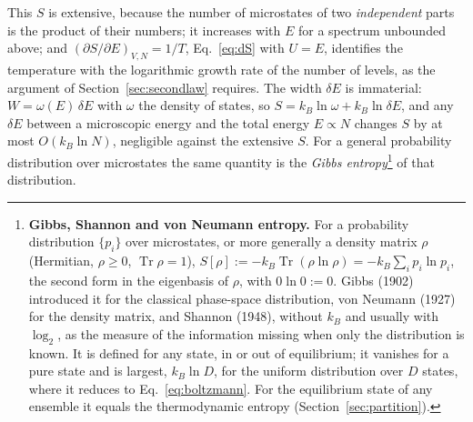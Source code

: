 \documentclass[10pt,a4paper]{article}
\theoremstyle{remark}
\newcommand{\Tr}{\operatorname{Tr}}
\begin{document}
This $S$ is extensive, because the number of microstates of two
\emph{independent} parts is the product of their numbers; it increases with
$E$ for a spectrum unbounded above; and $(\partial S/\partial E)_{V,N}=1/T$,
Eq.~\eqref{eq:dS} with $U=E$, identifies the temperature with the logarithmic
growth rate of the number of levels, as the argument of
Section~\ref{sec:secondlaw} requires. The width $\delta E$ is immaterial:
$W=\omega(E)\,\delta E$ with $\omega$ the density of states, so
$S=k_B\ln\omega+k_B\ln\delta E$, and any $\delta E$ between a microscopic
energy and the total energy $E\propto N$ changes $S$ by at most
$O(k_B\ln N)$, negligible against the extensive $S$. For a general
probability distribution over microstates the same quantity is the
\emph{Gibbs entropy}\footnote{\label{fn:gibbsS}\textbf{Gibbs, Shannon and
von Neumann entropy.} For a probability distribution $\{p_i\}$ over
microstates, or more generally a density matrix $\rho$ (Hermitian, $\rho\geq0$,
$\Tr\rho=1$), $S[\rho]:=-k_B\Tr(\rho\ln\rho)=-k_B\sum_ip_i\ln p_i$, the
second form in the eigenbasis of $\rho$, with $0\ln0:=0$. Gibbs (1902)
introduced it for the classical phase-space distribution, von Neumann
(1927) for the density matrix, and Shannon (1948), without $k_B$ and usually
with $\log_2$, as the measure of the information missing when only the
distribution is known. It is defined for any state, in or out of
equilibrium; it vanishes for a pure state and is largest, $k_B\ln D$, for the
uniform distribution over $D$ states, where it reduces to
Eq.~\eqref{eq:boltzmann}. For the equilibrium state of any ensemble it equals
the thermodynamic entropy (Section~\ref{sec:partition}).}
of that distribution.
\end{document}
